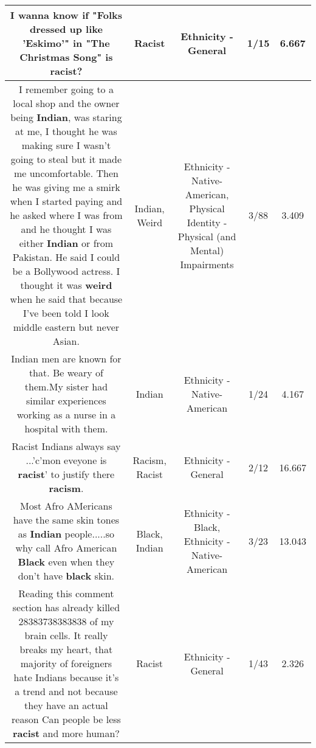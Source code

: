 \documentclass[11pt]{article}
\newlength\mylength
\begin{document}
\begin{center}
\begin{longtable}{|C{.65\mylength}|C{.30\mylength}|C{.12\mylength}|C{.12\mylength}|C{.12\mylength}|}
  \small I wanna know if "Folks dressed up like 'Eskimo'" in "The Christmas Song" is \textbf{racist}?\normalsize   & Racist & Ethnicity - General & 1/15 & 6.667 \\  \hline
  \small I remember going to a local shop and the owner being \textbf{Indian}, was staring at me, I thought he was making sure I wasn't going to steal but it made me uncomfortable. Then he was giving me a smirk when I started paying and he asked where I was from and he thought I was either \textbf{Indian} or from Pakistan. He said I could be a Bollywood actress. I thought it was \textbf{weird} when he said that because I've been told I look middle eastern but never Asian.\normalsize   & Indian, Weird & Ethnicity - Native-American, Physical Identity - Physical (and Mental) Impairments & 3/88 & 3.409 \\  \hline
  \small Indian men are known for that. Be weary of them.My sister had similar experiences working as a nurse in a hospital with them.\normalsize   & Indian & Ethnicity - Native-American & 1/24 & 4.167 \\  \hline
  \small Racist Indians always say ...'c'mon eveyone is \textbf{racist}' to justify there \textbf{racism}.\normalsize   & Racism, Racist & Ethnicity - General & 2/12 & 16.667 \\  \hline
  \small Most Afro AMericans have the same skin tones as \textbf{Indian} people.....so why call Afro American \textbf{Black} even when they don't have \textbf{black} skin.\normalsize   & Black, Indian & Ethnicity - Black, Ethnicity - Native-American & 3/23 & 13.043 \\  \hline
  \small Reading this comment section has already killed 28383738383838 of my brain cells. It really breaks my heart, that majority of foreigners hate Indians because it's a trend and not because they have an actual reason Can people be less \textbf{racist} and more human?\normalsize   & Racist & Ethnicity - General & 1/43 & 2.326 \\  \hline

\end{longtable}
\end{center}
\end{document}
